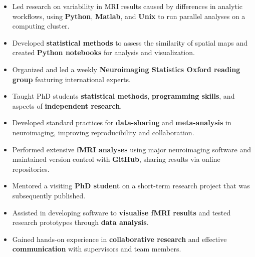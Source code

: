 \documentclass{my_cv}
\begin{document}
%
{\begin{itemize}[topsep=0pt,itemsep=0pt,partopsep=0pt, parsep=0pt]    
    \item Led research on variability in MRI results caused by differences in analytic workflows, using \textbf{Python}, \textbf{Matlab}, and \textbf{Unix} to run parallel analyses on a computing cluster.
    \item Developed \textbf{statistical methods} to assess the similarity of spatial maps and created \textbf{Python notebooks} for analysis and visualization.
    \item Organized and led a weekly \textbf{Neuroimaging Statistics Oxford reading group} featuring international experts.
    \item Taught PhD students \textbf{statistical methods}, \textbf{programming skills}, and aspects of \textbf{independent research}.
\end{itemize}
}%

%
{\begin{itemize}[topsep=0pt,itemsep=0pt,partopsep=0pt, parsep=0pt] 
    \item Developed standard practices for \textbf{data-sharing} and \textbf{meta-analysis} in neuroimaging, improving reproducibility and collaboration.
    \item Performed extensive \textbf{fMRI analyses} using major neuroimaging software and maintained version control with \textbf{GitHub}, sharing results via online repositories.
    \item Mentored a visiting \textbf{PhD student} on a short-term research project that was subsequently published.
\end{itemize}
}%
     
%
{\uline{ \hfill {}}}%
{\begin{itemize}[topsep=0pt,itemsep=0pt,partopsep=0pt, parsep=0pt] 
    \item Assisted in developing software to \textbf{visualise fMRI results} and tested research prototypes through \textbf{data analysis}.
    \item Gained hands-on experience in \textbf{collaborative research} and effective \textbf{communication} with supervisors and team members.
\end{itemize}
}%
\end{document}
